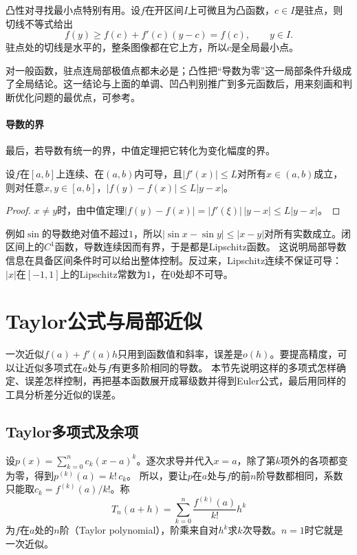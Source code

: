 凸性对寻找最小点特别有用。设$f$在开区间$I$上可微且为凸函数，$c\in I$是驻点，则切线不等式给出
\[
 f(y)\geq f(c)+f'(c)(y-c)=f(c),\qquad y\in I.
\]
驻点处的切线是水平的，整条图像都在它上方，所以$c$是全局最小点。

对一般函数，驻点连局部极值点都未必是；凸性把“导数为零”这一局部条件升级成了全局结论。这一结论与上面的单调、凹凸判别推广到多元函数后，用来刻画和判断优化问题的最优点，可参考。

\paragraph{导数的界}
最后，若导数有统一的界，中值定理把它转化为变化幅度的界。
\begin{theorem}[有界导数与Lipschitz条件]
\label{thm:analysis-bounded-derivative-lipschitz}
设$f$在$[a,b]$上连续、在$(a,b)$内可导，且$|f'(x)|\leq L$对所有$x\in(a,b)$成立，则对任意$x,y\in[a,b]$，$|f(y)-f(x)|\leq L|y-x|$。
\end{theorem}
\begin{proof}
$x\neq y$时，由中值定理$|f(y)-f(x)|=|f'(\xi)|\,|y-x|\leq L|y-x|$。
\end{proof}
例如$\sin$的导数绝对值不超过$1$，所以$|\sin x-\sin y|\leq|x-y|$对所有实数成立。闭区间上的$C^1$函数，导数连续因而有界，于是都是Lipschitz函数。
这说明局部导数信息在具备区间条件时可以给出整体控制。反过来，Lipschitz连续不保证可导：$|x|$在$[-1,1]$上的Lipschitz常数为$1$，在$0$处却不可导。
\section{Taylor公式与局部近似}
\label{sec:ru-taylor}
\label{sec:analysis-taylor-approximation}

一次近似$f(a)+f'(a)h$只用到函数值和斜率，误差是$o(h)$。要提高精度，可以让近似多项式在$a$处与$f$有更多阶相同的导数。
本节先说明这样的多项式怎样确定、误差怎样控制，再把基本函数展开成幂级数并得到Euler公式，最后用同样的工具分析差分近似的误差。

\subsection{Taylor多项式及余项}
\label{sec:ru-taylor-remainders}

设$p(x)=\sum_{k=0}^nc_k(x-a)^k$。逐次求导并代入$x=a$，除了第$k$项外的各项都变为零，得到$p^{(k)}(a)=k!\,c_k$。
所以，要让$p$在$a$处与$f$的前$n$阶导数都相同，系数只能取$c_k=f^{(k)}(a)/k!$。称
\begin{equation}
 T_n(a+h)=\sum_{k=0}^n\frac{f^{(k)}(a)}{k!}h^k
 \label{eq:ru-taylor-polynomial}
\end{equation}
为$f$在$a$处的$n$阶（Taylor polynomial），阶乘来自对$h^k$求$k$次导数。$n=1$时它就是一次近似。

